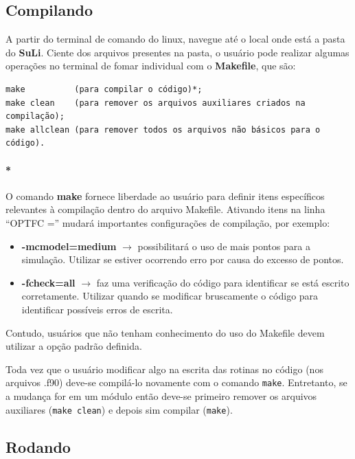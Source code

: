 \documentclass[12pt, a4paper]{article}
\newcommand{\SL}{{\bf SuLi}}
\begin{document}
\subsection{Compilando}
A partir do terminal de comando do linux, navegue até o local onde está a pasta do \SL . Ciente dos arquivos presentes na pasta, o usuário pode realizar algumas operações no terminal de fomar individual com o {\bf{Makefile}}, que são:
\label{limpar_dados}
\begin{verbatim}
make          (para compilar o código)*; 
make clean    (para remover os arquivos auxiliares criados na compilação);
make allclean (para remover todos os arquivos não básicos para o código).
\end{verbatim} 

\paragraph{*}	\label{infosmake}
O comando {\bf{make}} fornece liberdade ao usuário para definir itens específicos relevantes à compilação dentro do arquivo Makefile. Ativando itens na linha ``OPTFC ='' mudará importantes configurações de compilação, por exemplo:
\begin{itemize}


\item\textbf{-mcmodel=medium} $\rightarrow$ possibilitará o uso de mais pontos para a simulação. Utilizar se estiver ocorrendo erro por causa do excesso de pontos.

\item\textbf{-fcheck=all} $\rightarrow$ faz uma verificação do código para identificar se está escrito corretamente. Utilizar quando se modificar bruscamente o código para identificar possíveis erros de escrita.

\end{itemize}
Contudo, usuários que não tenham conhecimento do uso do Makefile devem utilizar a opção padrão definida.

Toda vez que o usuário modificar algo na escrita das rotinas no código (nos arquivos .f90) deve-se compilá-lo novamente com o comando \verb!make!. Entretanto, se a mudança for em um módulo então deve-se primeiro remover os arquivos auxiliares (\verb!make clean!) e depois sim compilar (\verb!make!).

\subsection{Rodando}
\end{document}
